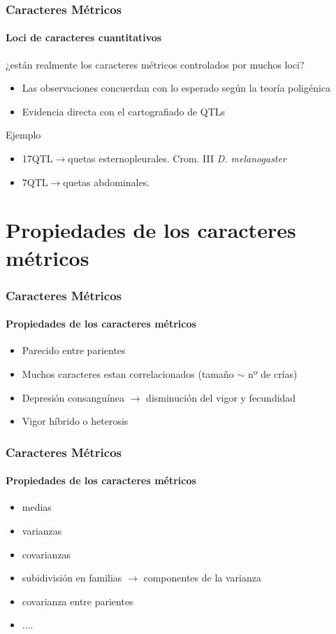 \documentclass{beamer}
\newenvironment{caja}
{
\begin{beamerboxesrounded}[upper=upcol,lower=lowcol,shadow=true]}
{\end{beamerboxesrounded}}
\begin{document}
\begin{frame}
\frametitle{Caracteres Métricos}
\framesubtitle{Loci de caracteres cuantitativos}
\begin{caja}{¿están realmente los caracteres métricos controlados por muchos loci?}
\begin{itemize}[<+- | alert@+>]
\item Las observaciones concuerdan con lo esperado según la teoría poligénica
\item Evidencia directa con el cartografiado de QTLs
\end{itemize}
\end{caja}
\pause
\begin{caja}{Ejemplo}
\begin{itemize}
\item 17QTL$\rightarrow$quetas esternopleurales. Crom. III \emph{D. melanogaster}
\item 7QTL$\rightarrow$quetas abdominales.
\end{itemize}
\end{caja}
\end{frame}


\section{Propiedades de los caracteres métricos}


\begin{frame}
\frametitle{Caracteres Métricos}
\framesubtitle{Propiedades de los caracteres métricos}
\begin{itemize}[<+-| alert@+>]
\item Parecido entre parientes
\item Muchos caracteres estan correlacionados (tamaño $\sim$ nº de crías)
\item Depresión consanguínea $\rightarrow$ disminución del vigor y fecundidad
\item Vigor híbrido o heterosis
\end{itemize}
\end{frame}


\begin{frame}
\frametitle{Caracteres Métricos}
\framesubtitle{Propiedades de los caracteres métricos}
\begin{itemize}[<+-| alert@+>]
\item medias
\item varianzas
\item covarianzas
\item subidivisión en familias $\rightarrow$ componentes de la varianza
\item covarianza entre parientes
\item ....
\end{itemize}
\end{frame}
\end{document}
